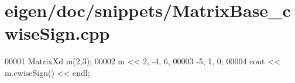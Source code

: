 \hypertarget{eigen_2doc_2snippets_2_matrix_base__cwise_sign_8cpp_source}{}\section{eigen/doc/snippets/\+Matrix\+Base\+\_\+cwise\+Sign.cpp}
\label{eigen_2doc_2snippets_2_matrix_base__cwise_sign_8cpp_source}

\begin{DoxyCode}
00001 MatrixXd m(2,3);
00002 m <<  2, -4, 6,
00003      -5,  1, 0;
00004 cout << m.cwiseSign() << endl;
\end{DoxyCode}
